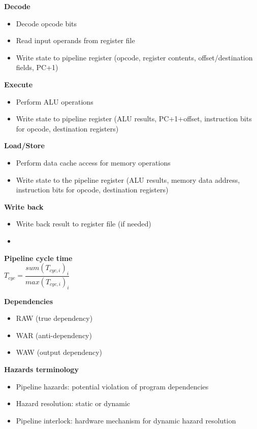 \documentclass[10pt,letterpaper,landscape]{report}
\newcommand{\boxheight}{21.59cm}
\newcommand{\boxwidth}{8.85cm}
\begin{document}
\begin{small}
{\begin{minipage}[t][\boxheight][c]{\boxwidth}
    \textbf{Decode}
    \begin{itemize}
        \item Decode opcode bits
        \item Read input operands from register file
        \item Write state to pipeline register (opcode, register contents, offset/destination fields, PC+1)
    \end{itemize}
    
    \textbf{Execute}
    \begin{itemize}
        \item Perform ALU operations
        \item Write state to pipeline register (ALU results, PC+1+offset, instruction bits for opcode, destination registers)
    \end{itemize}
    
    \textbf{Load/Store}
    \begin{itemize}
        \item Perform data cache access for memory operations
        \item Write state to the pipeline register (ALU results, memory data address, instruction bits for opcode, destination registers)
    \end{itemize}
    
    \textbf{Write back}
    \begin{itemize}
        \item Write back result to register file (if needed)
        \item 
    \end{itemize}
    
    \textbf{Pipeline cycle time}\\
    $T_{cyc}  = \dfrac{sum(T_{cyc, i})_i}{max(T_{cyc, i})_i}$

    \textbf{Dependencies}
    \begin{itemize}
        \item RAW (true dependency)
        \item WAR (anti-dependency)
        \item WAW (output dependency)
    \end{itemize}
    
    \textbf{Hazards terminology}
    \begin{itemize}
        \item Pipeline hazards: potential violation of program dependencies
        \item Hazard resolution: static or dynamic
        \item Pipeline interlock: hardware mechanism for dynamic hazard resolution
    \end{itemize}
    

\end{minipage}}
\end{small}
\end{document}
